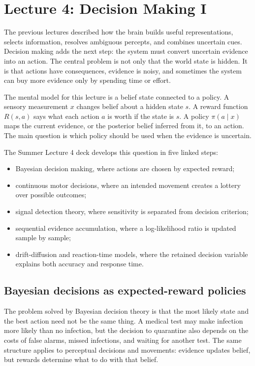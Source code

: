 \section{Lecture 4: Decision Making I}

The previous lectures described how the brain builds useful representations, selects information, resolves ambiguous percepts, and combines uncertain cues. Decision making adds the next step: the system must convert uncertain evidence into an action. The central problem is not only that the world state is hidden. It is that actions have consequences, evidence is noisy, and sometimes the system can buy more evidence only by spending time or effort.

The mental model for this lecture is a belief state connected to a policy. A sensory measurement \(x\) changes belief about a hidden state \(s\). A reward function \(R(s,a)\) says what each action \(a\) is worth if the state is \(s\). A policy \(\pi(a\mid x)\) maps the current evidence, or the posterior belief inferred from it, to an action. The main question is which policy should be used when the evidence is uncertain.

The Summer Lecture 4 deck develops this question in five linked steps:
\begin{itemize}
    \item Bayesian decision making, where actions are chosen by expected reward;
    \item continuous motor decisions, where an intended movement creates a lottery over possible outcomes;
    \item signal detection theory, where sensitivity is separated from decision criterion;
    \item sequential evidence accumulation, where a log-likelihood ratio is updated sample by sample;
    \item drift-diffusion and reaction-time models, where the retained decision variable explains both accuracy and response time.
\end{itemize}

\subsection{Bayesian decisions as expected-reward policies}

The problem solved by Bayesian decision theory is that the most likely state and the best action need not be the same thing. A medical test may make infection more likely than no infection, but the decision to quarantine also depends on the costs of false alarms, missed infections, and waiting for another test. The same structure applies to perceptual decisions and movements: evidence updates belief, but rewards determine what to do with that belief.

